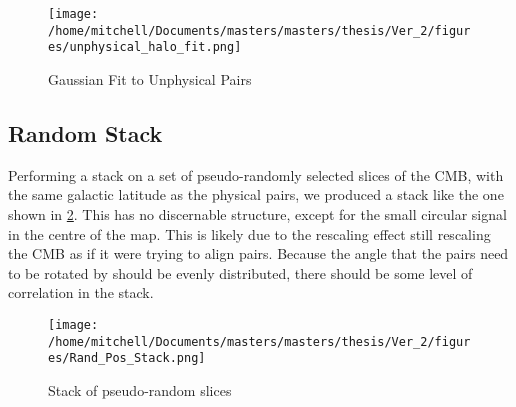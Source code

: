 \begin{figure}[h!]
\centering
\texttt{[image: /home/mitchell/Documents/masters/masters/thesis/Ver\_2/figures/unphysical\_halo\_fit.png]}
\caption{Gaussian Fit to Unphysical Pairs}
\label{fig:unphysical:fit}
\end{figure}

\subsection{Random Stack}

Performing a stack on a set of pseudo-randomly selected slices of the CMB, with the same galactic latitude as the physical pairs, we produced a stack like the one shown in \ref{fig:random:stack}. This has no discernable structure, except for the small circular signal in the centre of the map. This is likely due to the rescaling effect still rescaling the CMB as if it were trying to align pairs. Because the angle that the pairs need to be rotated by should be evenly distributed, there should be some level of correlation in the stack.

\begin{figure}[h!]
\centering
\texttt{[image: /home/mitchell/Documents/masters/masters/thesis/Ver\_2/figures/Rand\_Pos\_Stack.png]}
\caption{Stack of pseudo-random slices}
\label{fig:random:stack}
\end{figure}